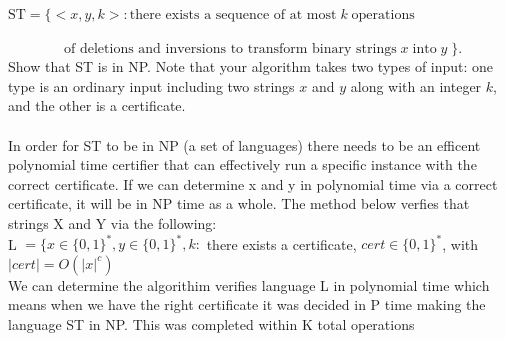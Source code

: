 \documentclass[11pt]{amsart}
\begin{document}
$\textrm{ST} = \{ <x, y, k>: \textrm{there exists a sequence of at most}\; k \; \textrm{operations}$

$\qquad \qquad \textrm{of deletions and inversions to transform binary strings}\; x\; \textrm{into}\; y\; \}$. \\

Show that ST is in NP. Note that your algorithm takes two types of input: one type is an ordinary input including two strings $x$ and $y$ along with an integer $k$, and the other is a certificate.
\\\\
In order for ST to be in NP (a set of languages) there needs to be an efficent polynomial time certifier that can effectively run a specific instance with the correct certificate. If we can determine x and y in polynomial time via a correct certificate, it will be in NP time as a whole. The method below verfies that strings X and Y via the following:\\L $= \{ x \in \{0,1\}^*, y \in \{0,1\}^*, k:$ there exists a certificate, $cert \in \{0,1\}^*$, with $|cert| = O(|x|^c)$\\ We can determine the algorithim verifies language L in polynomial time which means when we have the right certificate it was decided in P time making the language ST in NP. This was completed within K total operations\\
\end{document}

